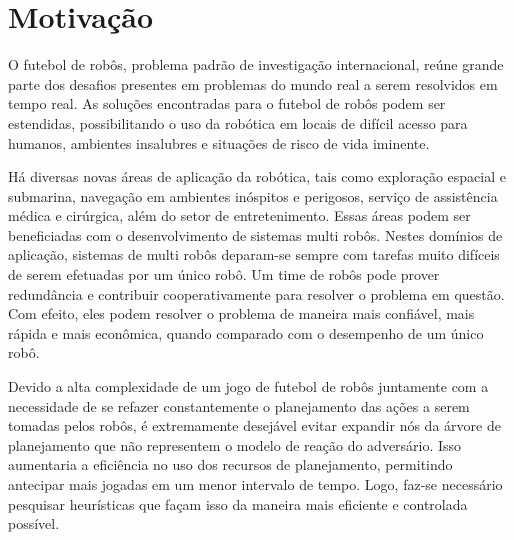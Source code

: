 \section{Motivação}

O futebol de robôs, problema padrão de investigação internacional, reúne grande parte
dos desafios presentes em problemas do mundo real a serem resolvidos em tempo real.
As soluções encontradas para o futebol de robôs podem ser estendidas, possibilitando
o uso da robótica em locais de difícil acesso para humanos, ambientes insalubres e
situações de risco de vida iminente.

Há diversas novas áreas de aplicação da robótica, tais como exploração espacial e submarina,
navegação em ambientes inóspitos e perigosos, serviço de assistência médica
e cirúrgica, além do setor de entretenimento. Essas áreas podem ser beneficiadas com o
desenvolvimento de sistemas
multi robôs. Nestes domínios de aplicação, sistemas de multi robôs deparam-se sempre
com tarefas muito difíceis de serem efetuadas por um único robô. Um time de robôs pode
prover redundância e contribuir cooperativamente para resolver o problema em questão.
Com efeito, eles podem resolver o problema de maneira mais confiável, mais rápida e
mais econômica, quando comparado com o desempenho de um único robô.



Devido a alta complexidade de um jogo de futebol de robôs juntamente com a
necessidade de se refazer constantemente o planejamento das ações a serem tomadas
pelos robôs, é extremamente desejável evitar expandir nós da árvore de
planejamento que não representem o modelo de reação do adversário. Isso
aumentaria a eficiência no uso dos recursos de planejamento, permitindo
antecipar mais jogadas em um menor intervalo de tempo. Logo, faz-se necessário
pesquisar heurísticas que façam isso da maneira mais eficiente e controlada
possível.

